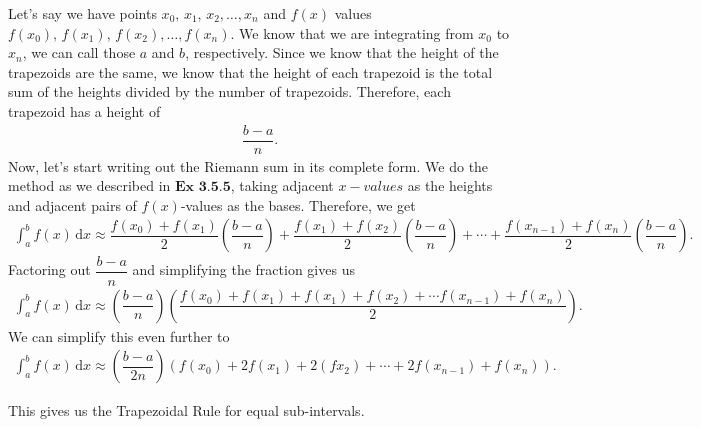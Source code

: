 Let's say we have points $x_0, \, x_1, \, x_2, \ldots, x_n$ and $f(x)$ values $f(x_0), \, f(x_1), \, f(x_2), \ldots, f(x_n)$. We know that we are integrating from $x_0$ to $x_n$, we can call those $a$ and $b$, respectively. Since we know that the height of the trapezoids are the same, we know that the height of each trapezoid is the total sum of the heights divided by the number of trapezoids. Therefore, each trapezoid has a height of \begin{align*}
    \dfrac{b - a}{n}.
\end{align*}
Now, let's start writing out the Riemann sum in its complete form. We do the method as we described in $\textbf{Ex 3.5.5}$, taking adjacent $x-values$ as the heights and adjacent pairs of $f(x)$-values as the bases. Therefore, we get{\small{\begin{align*}
    \int_a^b f(x) \,\mathrm{d}x \approx \dfrac{f(x_0) + f(x_1)}{2}\left(\dfrac{b - a}{n}\right) + \dfrac{f(x_1) + f(x_2)}{2}\left(\dfrac{b - a}{n}\right) + \cdots + \dfrac{f(x_{n - 1}) + f(x_n)}{2}\left(\dfrac{b - a}{n}\right).
\end{align*}}}
Factoring out $\dfrac{b - a}{n}$ and simplifying the fraction gives us\begin{align*}
    \int_a^b f(x) \,\mathrm{d}x \approx \left(\dfrac{b - a}{n}\right)\left(\dfrac{f(x_0) + f(x_1) + f(x_1) + f(x_2) + \cdots f(x_{n - 1}) + f(x_n)}{2}\right).
\end{align*}
We can simplify this even further to \begin{align*}
    \int_a^b f(x) \,\mathrm{d}x \approx \left(\dfrac{b - a}{2n}\right)\left(f(x_0) + 2f(x_1) + 2(fx_2) + \cdots + 2f(x_{n - 1}) + f(x_n)\right).
\end{align*}

This gives us the Trapezoidal Rule for equal sub-intervals. \par

\begin{center}
\end{center}

